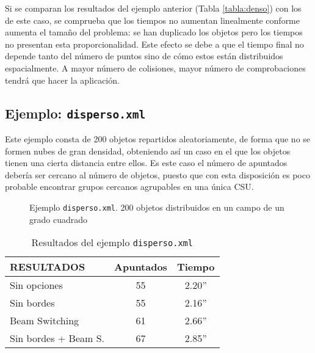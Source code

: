 Si se comparan los resultados del ejemplo anterior (Tabla \ref{tabla:denso}) con
los de este caso, se comprueba que los tiempos no aumentan linealmente conforme
aumenta el tamaño del problema: se han duplicado los objetos pero los tiempos no
presentan esta proporcionalidad. 
Este efecto se debe a que el tiempo final no depende tanto del número de
puntos sino de cómo estos están distribuidos espacialmente. 
A mayor número de colisiones, mayor número de comprobaciones tendrá que hacer la aplicación.

\subsection {Ejemplo: \texttt{disperso.xml}}
Este ejemplo consta de 200 objetos repartidos aleatoriamente, de forma que no se
formen nubes de gran densidad, obteniendo así un caso en el que los objetos 
tienen una cierta distancia entre ellos. Es este caso el número de apuntados
debería ser cercano al número de objetos, puesto que con esta disposición es
poco probable encontrar grupos cercanos agrupables en una única CSU.

\begin{figure}[!htb]
\centering
{}
\caption{Ejemplo \texttt{disperso.xml}. 200 objetos distribuidos en un campo de un grado cuadrado}
\end{figure}

\begin{table*}[!ht]
\centering
\begin{tabular}{||l||c|c||}
\hline
\hline
RESULTADOS & Apuntados & Tiempo \\
\hline
\hline
Sin opciones & 55 & 2.20'' \\
\hline
Sin bordes & 55& 2.16'' \\
\hline
Beam Switching & 61 & 2.66'' \\
\hline
Sin bordes + Beam S. & 67& 2.85'' \\
\hline
\hline
\end{tabular}
\caption{Resultados del ejemplo \texttt{disperso.xml}}
\end{table*}

